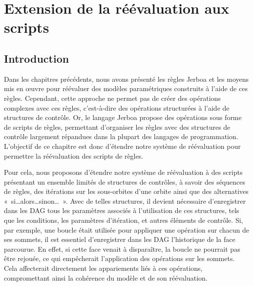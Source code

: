\chapter{Extension de la réévaluation aux scripts}
\label{cha:extension-scripts}



\section{Introduction}
\label{sec:extension-scripts-introduction}



Dans les chapitres précédents, nous avons présenté les règles Jerboa et les moyens mis en \oe uvre pour réévaluer des modèles paramétriques construits à l'aide de ces règles. Cependant, cette approche ne permet pas de créer des opérations complexes avec ces règles, c'est-à-dire des opérations structurées à l'aide de structures de contrôle. Or, le langage Jerboa propose des opérations sous forme de scripts de règles, permettant d'organiser les règles avec des structures de contrôle largement répandues dans la plupart des langages de programmation. L'objectif de ce chapitre est donc d'étendre notre système de réévaluation pour permettre la réévaluation des scripts de règles.

Pour cela, nous proposons d'étendre notre système de réévaluation à des scripts
présentant un ensemble limités de structures de contrôles, à savoir des
séquences de règles, des itérations sur les sous-orbites d'une orbite ainsi que
des alternatives «~si…alors…sinon…~». %
Avec de telles structures, il devient nécessaire d'enregistrer dans les DAG tous les paramètres associés à l'utilisation de ces structures, tels que les conditions, les paramètres d'itération, et autres éléments de contrôle. Si, par exemple, une boucle était utilisée pour appliquer une opération sur chacun de ses sommets, il est essentiel d'enregistrer dans les DAG l'historique de la face parcourue. En effet, si cette face venait à disparaître, la boucle ne pourrait pas être rejouée, ce qui empêcherait l'application des opérations sur les sommets. Cela affecterait directement les appariements liés à ces opérations, compromettant ainsi la cohérence du modèle et de son réévaluation.%


